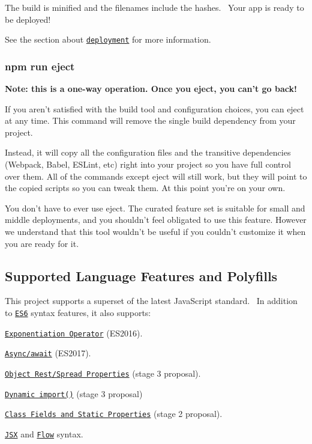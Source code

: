 The build is minified and the filenames include the hashes.~\newline
 Your app is ready to be deployed!

See the section about \href{#deployment}{\tt deployment} for more information.

\subsubsection*{{\ttfamily npm run eject}}

{\bfseries Note\+: this is a one-\/way operation. Once you {\ttfamily eject}, you can’t go back!}

If you aren’t satisfied with the build tool and configuration choices, you can {\ttfamily eject} at any time. This command will remove the single build dependency from your project.

Instead, it will copy all the configuration files and the transitive dependencies (Webpack, Babel, E\+S\+Lint, etc) right into your project so you have full control over them. All of the commands except {\ttfamily eject} will still work, but they will point to the copied scripts so you can tweak them. At this point you’re on your own.

You don’t have to ever use {\ttfamily eject}. The curated feature set is suitable for small and middle deployments, and you shouldn’t feel obligated to use this feature. However we understand that this tool wouldn’t be useful if you couldn’t customize it when you are ready for it.

\subsection*{Supported Language Features and Polyfills}

This project supports a superset of the latest Java\+Script standard.~\newline
 In addition to \href{https://github.com/lukehoban/es6features}{\tt E\+S6} syntax features, it also supports\+:


\begin{DoxyItemize}
\item \href{https://github.com/rwaldron/exponentiation-operator}{\tt Exponentiation Operator} (E\+S2016).
\item \href{https://github.com/tc39/ecmascript-asyncawait}{\tt Async/await} (E\+S2017).
\item \href{https://github.com/sebmarkbage/ecmascript-rest-spread}{\tt Object Rest/\+Spread Properties} (stage 3 proposal).
\item \href{https://github.com/tc39/proposal-dynamic-import}{\tt Dynamic import()} (stage 3 proposal)
\item \href{https://github.com/tc39/proposal-class-public-fields}{\tt Class Fields and Static Properties} (stage 2 proposal).
\item \href{https://facebook.github.io/react/docs/introducing-jsx.html}{\tt J\+SX} and \href{https://flowtype.org/}{\tt Flow} syntax.
\end{DoxyItemize}

